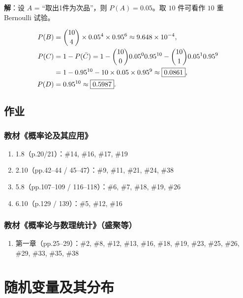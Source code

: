 \documentclass[11pt,a4paper]{report}
\theoremstyle{definition}
\begin{document}
\textbf{解}：设 $A$ = ``取出1件为次品''，则 $P(A)=0.05$。取 $10$ 件可看作 $10$ 重 Bernoulli 试验。

\begin{align*}
P(B) &= \dbinom{10}{4} \times 0.05^4 \times 0.95^6 \approx 9.648 \times 10^{-4}, \\
P(C) &= 1 - P(\bar{C}) = 1 - \dbinom{10}{0}0.05^0 0.95^{10} - \dbinom{10}{1}0.05^1 0.95^9 \\
&= 1 - 0.95^{10} - 10 \times 0.05 \times 0.95^9 \approx \boxed{0.0861}, \\
P(D) &= 0.95^{10} \approx \boxed{0.5987}.
\end{align*}

\section*{作业}


\subsection*{教材《概率论及其应用》}
\begin{enumerate}[label=\arabic*.,leftmargin=2em]
    \item 1.8（p.20/21）：\#14, \#16, \#17, \#19
    \item 2.10（pp.42--44 / 45--47）：\#9, \#11, \#21, \#24, \#38
    \item 5.8（pp.107--109 / 116--118）：\#6, \#7, \#18, \#19, \#26
    \item 6.10（p.129 / 139）：\#5, \#12, \#16
\end{enumerate}

\subsection*{教材《概率论与数理统计》（盛聚等）}
\begin{enumerate}[label=\arabic*.,leftmargin=2em]
    \item 第一章（pp.25--29）：\#2, \#8, \#12, \#13, \#16, \#18, \#19, \#23, \#25, \#26, \#29, \#33, \#35, \#38
\end{enumerate}

\newpage
\chapter{随机变量及其分布}
\end{document}
